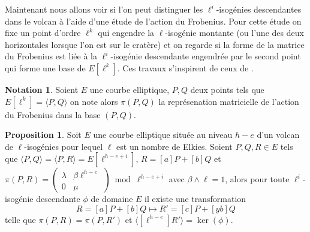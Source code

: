 \documentclass[10pt,a4paper]{book}
\theoremstyle{plain}
\theoremstyle{definition}
\theoremstyle{definition}
\theoremstyle{definition}
\newtheorem{prop}[thm]{Proposition}
\theoremstyle{definition}
\theoremstyle{remark}
\theoremstyle{remark}
\theoremstyle{definition}
\newtheorem{nota}[thm]{Notation}
\begin{document}
Maintenant nous allons voir si l'on peut distinguer les 
$\ell^i$-isogénies descendantes dans le volcan à l'aide d'une étude de l'action
du Frobenius. Pour cette étude on fixe un point d'ordre $\ell^k$ qui engendre 
la $\ell$-isogénie montante (ou l'une des deux horizontales lorsque l'on est 
sur le cratère) et on regarde si la forme de la matrice du Frobenius est liée à
la $\ell^i$-isogénie descendante engendrée par le second point qui forme une 
base de $E[\ell^k]$.  Ces travaux s'inspirent de ceux de \cite[Chapitre 6]{Master13}.


\begin{nota} 
Soient $E$ une courbe elliptique, $P,Q$ deux points tels que $E[\ell^k]=\langle
P,Q \rangle$ on note alors $\pi(P,Q)$ la représenation matricielle de l'action
du Frobenius dans la base $(P,Q)$.
\end{nota}

\begin{prop}
\label{pro:etu:atk:elk}
Soit $E$ une courbe elliptique située au niveau $h-e$ d'un volcan de 
$\ell$-isogénies pour lequel $\ell$ est un nombre de Elkies. Soient $P,Q, R 
\in E$ tels que $\langle P,Q \rangle= \langle P,R \rangle =E[\ell^{h-e+i}]$, 
$R=[a]P+[b]Q$ et $\pi(P,R)= \left( \begin{matrix}\lambda & \beta 
\ell^{h-e} \\0 & \mu \end{matrix}\right) \bmod \ell^{h-e+i}$ avec $\beta \wedge
\ell=1$, alors pour toute $\ell^i$-isogénie descendante $\phi$ de domaine $E$ il
existe une transformation \begin{equation*}
R=[a]P+[b]Q \mapsto R'=[c]P+[yb]Q
\end{equation*}
telle que $\pi(P,R)=\pi(P,R')$ et $\langle [\ell^{h-e}]R' \rangle = \ker(\phi)$.
\end{prop}
\end{document}
